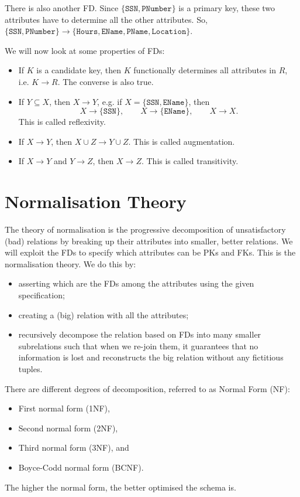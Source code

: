 \documentclass[a4paper, openany]{memoir}
\begin{document}
There is also another FD. Since $\{\texttt{SSN}, \texttt{PNumber}\}$ is a primary key, these two attributes have to determine all the other attributes. So, $\{\texttt{SSN}, \texttt{PNumber}\} \to \{\texttt{Hours}, \texttt{EName}, \texttt{PName}, \texttt{Location}\}$.

We will now look at some properties of FDs:
\begin{itemize}
    \item If $K$ is a candidate key, then $K$ functionally determines all attributes in $R$, i.e. $K \to R$. The converse is also true.
    
    \item If $Y \subseteq X$, then $X \to Y$, e.g. if $X = \{\texttt{SSN}, \texttt{EName}\}$, then
    \[X \to \{\texttt{SSN}\}, \qquad X \to \{\texttt{EName}\}, \qquad X \to X.\]
    This is called reflexivity.
    
    \item If $X \to Y$, then $X \cup Z \to Y \cup Z$. This is called augmentation.
    
    \item If $X \to Y$ and $Y \to Z$, then $X \to Z$. This is called transitivity.
\end{itemize}

\newpage

\section{Normalisation Theory}
The theory of normalisation is the progressive decomposition of unsatisfactory (bad) relations by breaking up their attributes into smaller, better relations. We will exploit the FDs to specify which attributes can be PKs and FKs. This is the normalisation theory. We do this by:
\begin{itemize}
    \item asserting which are the FDs among the attributes using the given specification;
    \item creating a (big) relation with all the attributes;
    \item recursively decompose the relation based on FDs into many smaller subrelations such that when we re-join them, it guarantees that no information is lost and reconstructs the big relation without any fictitious tuples.
\end{itemize}

There are different degrees of decomposition, referred to as Normal Form (NF):
\begin{itemize}
    \item First normal form (1NF),
    \item Second normal form (2NF),
    \item Third normal form (3NF), and
    \item Boyce-Codd normal form (BCNF).
\end{itemize}
The higher the normal form, the better optimised the schema is.
\end{document}
